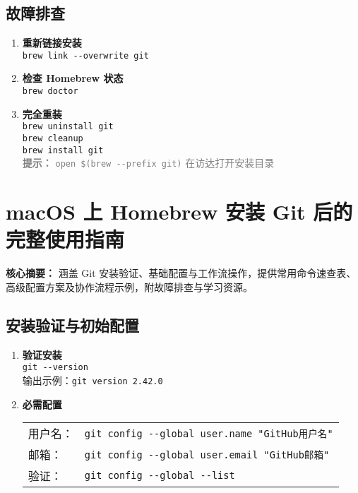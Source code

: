 \subsection{故障排查}
\begin{enumerate}[leftmargin=*, nosep]
    \item \textbf{重新链接安装} \\ 
    \texttt{brew link {-}{-}overwrite git}
    
    \item \textbf{检查 Homebrew 状态} \\ 
    \texttt{brew doctor}
    
    \item \textbf{完全重装} \\ 
    \texttt{brew uninstall git} \\ 
    \texttt{brew cleanup} \\ 
    \texttt{brew install git} \\[0.5em]
    \textcolor{gray}{\textbf{提示：} \texttt{open \$(brew {-}{-}prefix git)} 在访达打开安装目录}
\end{enumerate}


\section{macOS 上 Homebrew 安装 Git 后的完整使用指南}
\textbf{核心摘要：}  
涵盖 Git 安装验证、基础配置与工作流操作，提供常用命令速查表、高级配置方案及协作流程示例，附故障排查与学习资源。

\subsection{安装验证与初始配置}
\begin{enumerate}[leftmargin=*, nosep]
    \item \textbf{验证安装} \\
    \texttt{git {-}{-}version} \\
    输出示例：\texttt{git version 2.42.0}
    
    \item \textbf{必需配置} \\
    \begin{tabular}{@{}ll@{}}
        用户名： & \texttt{git config {-}{-}global user.name "GitHub用户名"} \\
        邮箱： & \texttt{git config {-}{-}global user.email "GitHub邮箱"} \\
        验证： & \texttt{git config {-}{-}global {-}{-}list}
    \end{tabular}
\end{enumerate}

